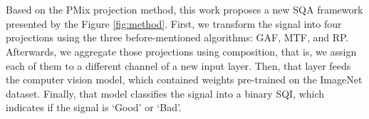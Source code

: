 

\section{}

Based on the \gls{PMix} projection method, this work proposes a new \gls{SQA} framework presented by the Figure \ref{fig:method}. First, we transform the signal into four projections using the three before-mentioned algorithms: \gls{GAF}, \gls{MTF}, and \gls{RP}. Afterwards, we aggregate those projections using composition, that is, we assign each of them to a different channel of a new input layer. Then, that layer feeds the computer vision model, which contained weights pre-trained on the ImageNet dataset. 
Finally, that model classifies the signal into a binary \gls{SQI}, which indicates if the signal is `Good' or `Bad'. 



